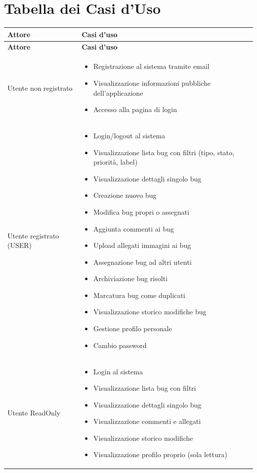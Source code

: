 \section{Tabella dei Casi d'Uso}

\begin{longtable}{|p{3cm}|p{11cm}|}
\hline
\textbf{Attore} & \textbf{Casi d'uso} \\
\hline
\endfirsthead
\hline
\textbf{Attore} & \textbf{Casi d'uso} \\
\hline
\endhead
\hline
\endfoot
\hline
\endlastfoot

Utente non registrato &
\begin{itemize}[leftmargin=*,nosep,nolistsep]
    \item Registrazione al sistema tramite email
    \item Visualizzazione informazioni pubbliche dell'applicazione
    \item Accesso alla pagina di login
\end{itemize} \\
\hline

Utente registrato (USER) &
\begin{itemize}[leftmargin=*,nosep,nolistsep]
    \item Login/logout al sistema
    \item Visualizzazione lista bug con filtri (tipo, stato, priorità, label)
    \item Visualizzazione dettagli singolo bug
    \item Creazione nuovo bug
    \item Modifica bug propri o assegnati
    \item Aggiunta commenti ai bug
    \item Upload allegati immagini ai bug
    \item Assegnazione bug ad altri utenti
    \item Archiviazione bug risolti
    \item Marcatura bug come duplicati
    \item Visualizzazione storico modifiche bug
    \item Gestione profilo personale
    \item Cambio password
\end{itemize} \\
\hline

Utente ReadOnly &
\begin{itemize}[leftmargin=*,nosep,nolistsep]
    \item Login al sistema
    \item Visualizzazione lista bug con filtri
    \item Visualizzazione dettagli singolo bug
    \item Visualizzazione commenti e allegati
    \item Visualizzazione storico modifiche
    \item Visualizzazione profilo proprio (sola lettura)
\end{itemize} \\
\hline


\end{longtable}
